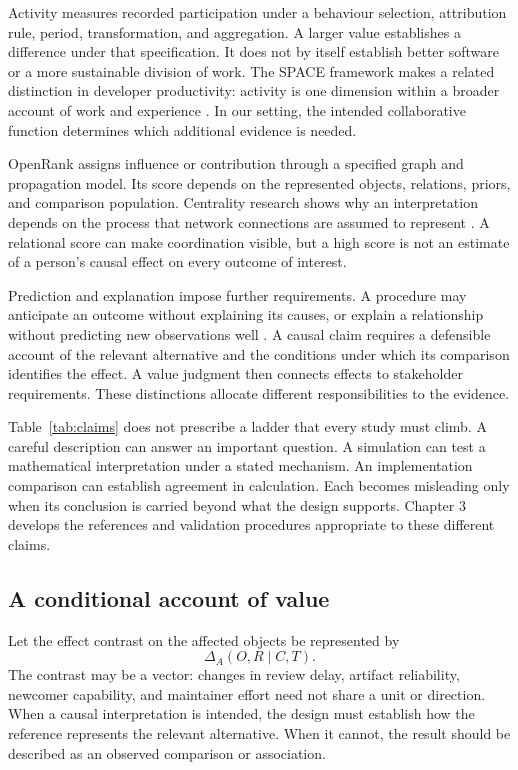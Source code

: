 Activity measures recorded participation under a behaviour selection, attribution rule, period, transformation, and aggregation. A larger value establishes a difference under that specification. It does not by itself establish better software or a more sustainable division of work. The SPACE framework makes a related distinction in developer productivity: activity is one dimension within a broader account of work and experience \citep{forsgren2021}. In our setting, the intended collaborative function determines which additional evidence is needed.

OpenRank assigns influence or contribution through a specified graph and propagation model. Its score depends on the represented objects, relations, priors, and comparison population. Centrality research shows why an interpretation depends on the process that network connections are assumed to represent \citep{borgatti2005}. A relational score can make coordination visible, but a high score is not an estimate of a person's causal effect on every outcome of interest.

Prediction and explanation impose further requirements. A procedure may anticipate an outcome without explaining its causes, or explain a relationship without predicting new observations well \citep{shmueli2010}. A causal claim requires a defensible account of the relevant alternative and the conditions under which its comparison identifies the effect. A value judgment then connects effects to stakeholder requirements. These distinctions allocate different responsibilities to the evidence.



Table~\ref{tab:claims} does not prescribe a ladder that every study must climb. A careful description can answer an important question. A simulation can test a mathematical interpretation under a stated mechanism. An implementation comparison can establish agreement in calculation. Each becomes misleading only when its conclusion is carried beyond what the design supports. Chapter 3 develops the references and validation procedures appropriate to these different claims.

\subsection{A conditional account of value}
Let the effect contrast on the affected objects be represented by
\begin{equation}
\Delta_A(O,R\mid C,T).
\label{eq:effects}
\end{equation}
The contrast may be a vector: changes in review delay, artifact reliability, newcomer capability, and maintainer effort need not share a unit or direction. When a causal interpretation is intended, the design must establish how the reference represents the relevant alternative. When it cannot, the result should be described as an observed comparison or association.

